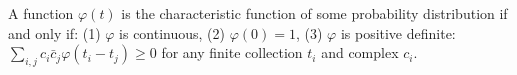 A function $\varphi(t)$ is the characteristic function of some probability distribution if and only if:
(1) $\varphi$ is continuous,
(2) $\varphi(0) = 1$,
(3) $\varphi$ is positive definite: $\sum_{i,j} c_i \bar{c}_j \varphi(t_i - t_j) \geq 0$ for any finite collection $t_i$ and complex $c_i$.
